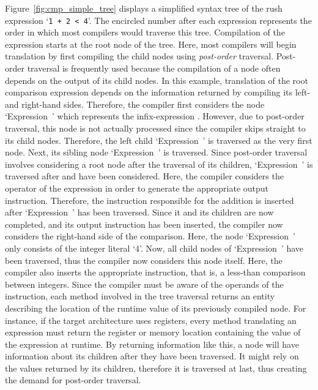 Figure~\ref{fig:cmp_simple_tree} displays a simplified syntax tree of the rush expression `\texttt{1 + 2 < 4}'.
The encircled number after each expression represents the order in which most compilers would traverse this tree.
Compilation of the expression starts at the root node of the tree.
Here, most compilers will begin translation by first compiling the child nodes using \emph{post-order} traversal.
Post-order traversal is frequently used because the compilation of a node often depends on the output of its child nodes.
In this example, translation of the root comparison expression depends on the information returned by compiling its left- and right-hand sides.
Therefore, the compiler first considers the node `Expression~' which represents the infix-expression .
However, due to post-order traversal, this node is not actually processed since the compiler skips straight to its child nodes.
Therefore, the left child `Expression~' is traversed as the very first node.
Next, its sibling node `Expression~' is traversed.
Since post-order traversal involves considering a root node after the traversal of its children, `Expression~' is traversed after  and  have been considered.
Here, the compiler considers the operator of the expression in order to generate the appropriate output instruction.
Therefore, the instruction responsible for the addition is inserted after `Expression~' has been traversed.
Since it and its children are now completed, and its output instruction has been inserted, the compiler now considers the right-hand side of the comparison.
Here, the node `Expression~' only consists of the integer literal `4'.
Now, all child nodes of `Expression~' have been traversed, thus the compiler now considers this node itself.
Here, the compiler also inserts the appropriate instruction, that is, a less-than comparison between integers.
Since the compiler must be aware of the operands of the instruction, each method involved in the tree traversal returns an entity describing the location of the runtime value of its previously compiled node.
For instance, if the target architecture uses registers, every method translating an expression must return the register or memory location containing the value of the expression at runtime.
By returning information like this, a node will have information about its children after they have been traversed.
It might rely on the values returned by its children, therefore it is traversed at last, thus creating the demand for post-order traversal.

